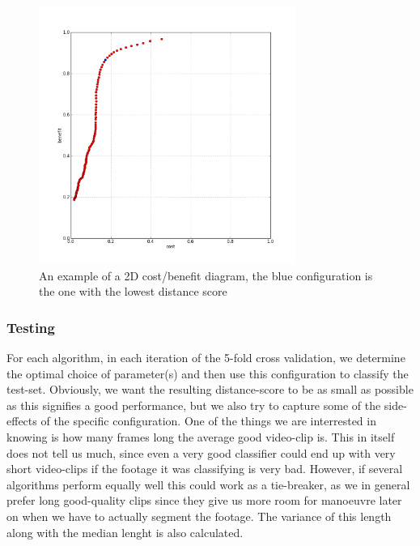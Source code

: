 \documentclass[12pt]{article}
\begin{document}
\begin{figure}
     \centering
     \includegraphics[width=0.75\textwidth]{img/2dcostbenefitexample2.jpg}
     \caption{An example of a 2D cost/benefit diagram, the blue configuration is the one with the lowest distance score}
\end{figure}
%
\subsubsection{Testing}
%
For each algorithm, in each iteration of the 5-fold cross validation, we determine the optimal choice of parameter(s) and then use this configuration to classify the test-set. Obviously, we want the resulting distance-score to be as small as possible as this signifies a good performance, but we also try to capture some of the side-effects of the specific configuration. One of the things we are interrested in knowing is how many frames long the average good video-clip is. This in itself does not tell us much, since even a very good classifier could end up with very short video-clips if the footage it was classifying is very bad. However, if several algorithms perform equally well this could work as a tie-breaker, as we in general prefer long good-quality clips since they give us more room for manoeuvre later on when we have to actually segment the footage. The variance of this length along with the median lenght is also calculated.
%
\end{document}
